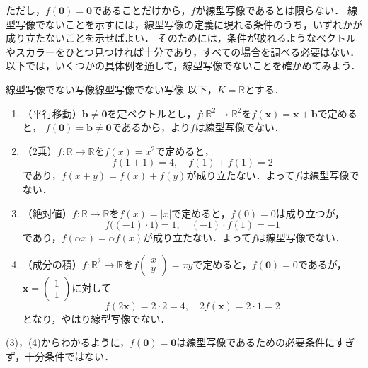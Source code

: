 ただし，$f(\bm{0}) = \bm{0}$であることだけから，$f$が線型写像であるとは限らない．
線型写像でないことを示すには，線型写像の定義に現れる条件のうち，いずれかが成り立たないことを示せばよい．
そのためには，条件が破れるようなベクトルやスカラーをひとつ見つければ十分であり，すべての場合を調べる必要はない．
以下では，いくつかの具体例を通して，線型写像でないことを確かめてみよう．

\begin{example}{線型写像でない写像}{線型写像でない写像}
  以下，$K = \mathbb{R}$とする．
  \begin{enumerate}[label=(\arabic*),leftmargin=3.2em]
    \item （平行移動）$\bm{b} \ne \bm{0}$を定ベクトルとし，$f \colon \mathbb{R}^2 \to \mathbb{R}^2$を$f(\bm{x}) = \bm{x} + \bm{b}$で定めると，
      $f(\bm{0}) = \bm{b} \ne \bm{0}$であるから，より$f$は線型写像でない．
    \item （$2$乗）$f \colon \mathbb{R} \to \mathbb{R}$を$f(x) = x^2$で定めると，
      \[
        f(1 + 1) = 4, \quad f(1) + f(1) = 2
      \]
      であり，$f(x + y) = f(x) + f(y)$が成り立たない．よって$f$は線型写像でない．
    \item （絶対値）$f \colon \mathbb{R} \to \mathbb{R}$を$f(x) = |x|$で定めると，$f(0) = 0$は成り立つが，
      \[
        f\bigl((-1) \cdot 1\bigr) = 1, \quad (-1) \cdot f(1) = -1
      \]
      であり，$f(\alpha x) = \alpha f(x)$が成り立たない．よって$f$は線型写像でない．
    \item （成分の積）$f \colon \mathbb{R}^2 \to \mathbb{R}$を$f\begin{pmatrix} x \\ y \end{pmatrix} = xy$で定めると，$f(\bm{0}) = 0$であるが，
      $\bm{x} = \begin{pmatrix} 1 \\ 1 \end{pmatrix}$に対して
      \[
        f(2\bm{x}) = 2 \cdot 2 = 4, \quad 2 f(\bm{x}) = 2 \cdot 1 = 2
      \]
      となり，やはり線型写像でない．
  \end{enumerate}
  (3)，(4)からわかるように，$f(\bm{0}) = \bm{0}$は線型写像であるための必要条件にすぎず，十分条件ではない．
\end{example}


